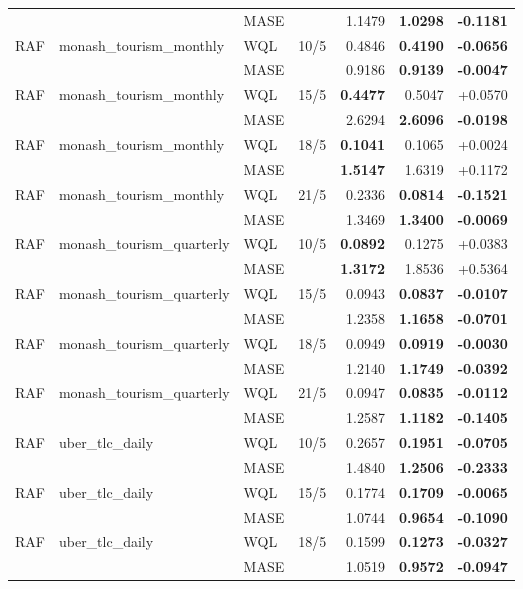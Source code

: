 \begin{longtable}{@{}lllrrrr@{}}
 &  & MASE &  & 1.1479 & \textbf{1.0298} & \textbf{-0.1181} \\
RAF & monash\_tourism\_monthly & WQL & 10/5 & 0.4846 & \textbf{0.4190} & \textbf{-0.0656} \\
 &  & MASE &  & 0.9186 & \textbf{0.9139} & \textbf{-0.0047} \\
RAF & monash\_tourism\_monthly & WQL & 15/5 & \textbf{0.4477} & 0.5047 & +0.0570 \\
 &  & MASE &  & 2.6294 & \textbf{2.6096} & \textbf{-0.0198} \\
RAF & monash\_tourism\_monthly & WQL & 18/5 & \textbf{0.1041} & 0.1065 & +0.0024 \\
 &  & MASE &  & \textbf{1.5147} & 1.6319 & +0.1172 \\
RAF & monash\_tourism\_monthly & WQL & 21/5 & 0.2336 & \textbf{0.0814} & \textbf{-0.1521} \\
 &  & MASE &  & 1.3469 & \textbf{1.3400} & \textbf{-0.0069} \\
RAF & monash\_tourism\_quarterly & WQL & 10/5 & \textbf{0.0892} & 0.1275 & +0.0383 \\
 &  & MASE &  & \textbf{1.3172} & 1.8536 & +0.5364 \\
RAF & monash\_tourism\_quarterly & WQL & 15/5 & 0.0943 & \textbf{0.0837} & \textbf{-0.0107} \\
 &  & MASE &  & 1.2358 & \textbf{1.1658} & \textbf{-0.0701} \\
RAF & monash\_tourism\_quarterly & WQL & 18/5 & 0.0949 & \textbf{0.0919} & \textbf{-0.0030} \\
 &  & MASE &  & 1.2140 & \textbf{1.1749} & \textbf{-0.0392} \\
RAF & monash\_tourism\_quarterly & WQL & 21/5 & 0.0947 & \textbf{0.0835} & \textbf{-0.0112} \\
 &  & MASE &  & 1.2587 & \textbf{1.1182} & \textbf{-0.1405} \\
RAF & uber\_tlc\_daily & WQL & 10/5 & 0.2657 & \textbf{0.1951} & \textbf{-0.0705} \\
 &  & MASE &  & 1.4840 & \textbf{1.2506} & \textbf{-0.2333} \\
RAF & uber\_tlc\_daily & WQL & 15/5 & 0.1774 & \textbf{0.1709} & \textbf{-0.0065} \\
 &  & MASE &  & 1.0744 & \textbf{0.9654} & \textbf{-0.1090} \\
RAF & uber\_tlc\_daily & WQL & 18/5 & 0.1599 & \textbf{0.1273} & \textbf{-0.0327} \\
 &  & MASE &  & 1.0519 & \textbf{0.9572} & \textbf{-0.0947} \\

\end{longtable}
